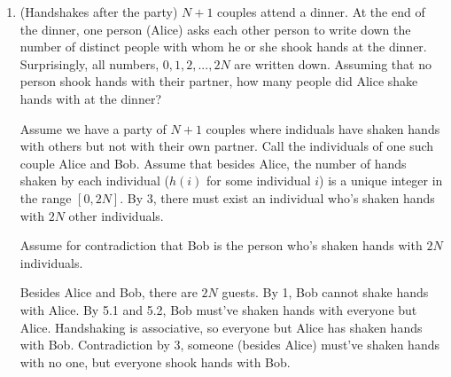 \documentclass[11pt]{article}
\newcommand\tab[1][1cm]{\hspace*{#1}}
\begin{document}
\begin{enumerate}
\begin{enumerate}
\begin{enumerate}
      \tab I really enjoyed Sehoon's proof. In comparison to the other At least 
      one round, at least one square solution I saw in the last skeptic exercise, 
      his looked extremely refined and was a pleasure to hear. I wasn't sure 
      what to tell him as far as wording it better for the proof, but his logic 
      and way of thinking were definitely sound. 

    \item

      Not much else to say after thinking about it. The two of them had very 
      clean thorough proofs that I still agree are easily complete.

    \end{enumerate}
    
  \item %

      \begin{theorem}[Problem 7]
       (Handshakes after the party) $N + 1$ couples attend a dinner. At the end of the dinner, 
        one person (Alice) asks each other person to write down the number of distinct people 
        with whom he or she shook hands at the dinner. Surprisingly, all numbers, 
        $0, 1, 2, ..., 2N$ are written down. Assuming that no person shook hands with their 
        partner, how many people did Alice shake hands with at the dinner?
      \end{theorem}

      \begin{longFormProof}
       \step Assume we have a party of $N + 1$ couples where indiduals have shaken 
              hands with others but not with their own partner.
       \step Call the individuals of one such couple Alice and Bob.
       \step Assume that besides Alice, the number of hands shaken by each individual 
            ($h(i)$ for some individual $i$) is a unique integer in the range $[0,2N]$.
       \step By 3, there must exist an individual who's shaken hands with $2N$ other individuals.
       \begin{block}[blockA]
          {Assume for contradiction that Bob is the person who's shaken hands with $2N$ individuals.}

          \step Besides Alice and Bob, there are $2N$ guests.
          \step By 1, Bob cannot shake hands with Alice.
          \step By 5.1 and 5.2, Bob must've shaken hands with everyone but Alice.
          \step Handshaking is associative, so everyone but Alice has shaken hands with Bob.
          \step Contradiction by 3, someone (besides Alice) must've shaken hands with no one, but everyone shook hands with Bob.
       

\end{block}
\end{longFormProof}
\end{enumerate}
\end{enumerate}
\end{document}
